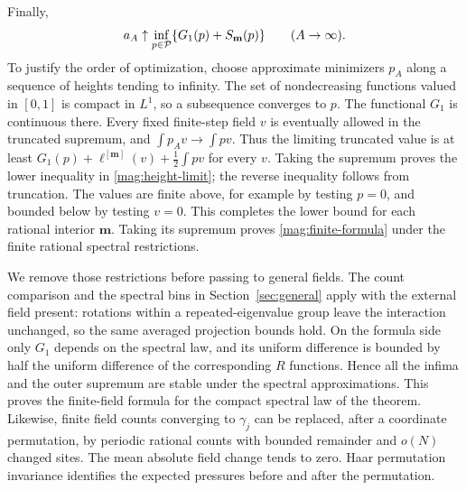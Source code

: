 Finally,
\begin{equation}\label{mag:height-limit}
 a_A\uparrow\inf_{p\in\mathcal P}\{G_1(p)+S_{\mathbf m}(p)\}
                   \qquad(A\to\infty).
\end{equation}
To justify the order of optimization, choose approximate minimizers
$p_A$ along a sequence of heights tending to infinity. The set of
nondecreasing functions valued in $[0,1]$ is compact in $L^1$, so a
subsequence converges to $p$. The functional $G_1$ is continuous there.
Every fixed finite-step field $v$ is eventually allowed in the truncated
supremum, and $\int p_Av\to\int pv$. Thus the limiting truncated value
is at least $G_1(p)+\ell^{[\mathbf m]}(v)+\tfrac12\int pv$ for every
$v$. Taking the supremum proves the lower inequality in
\eqref{mag:height-limit}; the reverse inequality follows from truncation.
The values are finite above, for example by testing $p=0$, and bounded
below by testing $v=0$. This completes the lower bound for each rational
interior $\mathbf m$. Taking its supremum proves
\eqref{mag:finite-formula} under the finite rational spectral restrictions.

We remove those restrictions before passing to general fields. The count
comparison and the spectral bins in Section~\ref{sec:general} apply with
the external field present: rotations within a repeated-eigenvalue group
leave the interaction unchanged, so the same averaged projection bounds
hold. On the formula side only $G_1$ depends on the spectral law, and its
uniform difference is bounded by half the uniform difference of the
corresponding $R$ functions. Hence all the infima and the outer supremum
are stable under the spectral approximations. This proves the finite-field
formula for the compact spectral law of the theorem. Likewise, finite
field counts converging to $\gamma_j$ can be replaced, after a coordinate
permutation, by periodic rational counts with bounded remainder and
$o(N)$ changed sites. The mean absolute field change tends to zero.
Haar permutation invariance identifies the expected pressures before
and after the permutation.

